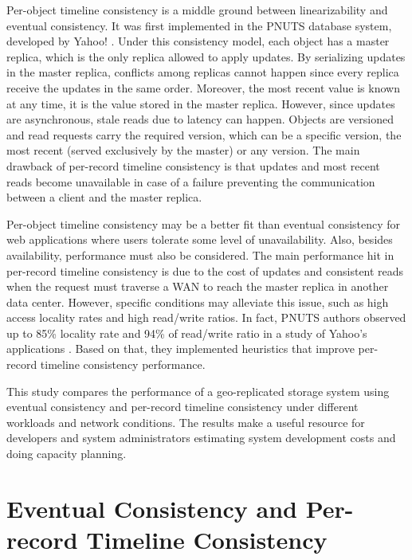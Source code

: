 \documentclass[doublespacing]{bmcart}
\begin{document}
Per-object timeline consistency is a middle ground between linearizability
\cite{Herlihy1990} and eventual consistency. It was first implemented in the
PNUTS database system, developed by Yahoo! \cite{Cooper2008}. Under this
consistency model, each object has a master replica, which is the only replica
allowed to apply updates. By serializing updates in the master replica,
conflicts among replicas cannot happen since every replica receive the updates
in the same order. Moreover, the most recent value is known at any time, it is
the value stored in the master replica. However, since updates are asynchronous,
stale reads due to latency can happen. Objects are versioned and read requests
carry the required version, which can be a specific version, the most recent
(served exclusively by the master) or any version. The main drawback of
per-record timeline consistency is that updates and most recent reads become
unavailable in case of a failure preventing the communication between a client
and the master replica.

Per-object timeline consistency may be a better fit than eventual consistency
for web applications where users tolerate some level of unavailability. Also,
besides availability, performance must also be considered. The main performance
hit in per-record timeline consistency is due to the cost of updates and
consistent reads when the request must traverse a WAN to reach the master
replica in another data center. However, specific conditions may alleviate this
issue, such as high access locality rates and high read/write ratios. In fact,
PNUTS authors observed up to 85\% locality rate and 94\% of read/write ratio in
a study of Yahoo's applications \cite{Cooper2008, Kadambi2011}. Based on that,
they implemented heuristics that improve per-record timeline consistency
performance.

This study compares the performance of a geo-replicated storage system using
eventual consistency and per-record timeline consistency under different
workloads and network conditions. The results make a useful resource for
developers and system administrators estimating system development costs and
doing capacity planning.

\section{Eventual Consistency and Per-record Timeline Consistency}
\end{document}
